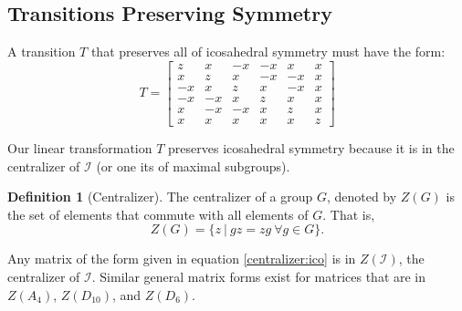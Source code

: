 \documentclass[a4paper,10pt]{article}
\theoremstyle{plain}
\theoremstyle{definition}
\newtheorem{Definition}[Theorem]{Definition}
\theoremstyle{remark}
\begin{document}
\subsection{Transitions Preserving Symmetry}
A transition \(T\) that preserves all of icosahedral symmetry must have the form: \begin{equation} \label{centralizer:ico}
T = \begin{bmatrix}
    z  & x  & -x & -x & x  & x \\
    x  & z  & x  & -x & -x & x \\
    -x & x  & z  & x  & -x & x \\
    -x & -x & x  & z  & x  & x \\
    x  & -x & -x & x  & z  & x \\
    x  & x  & x  & x  & x  & z
\end{bmatrix}\end{equation}

Our linear transformation \(T\) preserves icosahedral symmetry because it is in the centralizer of \(\mathcal{I}\) (or one its of maximal subgroups).
\begin{Definition}[Centralizer]
    The centralizer of a group \(G\), denoted by \(Z(G)\) is the set of elements that commute with all elements of \(G\).
    That is, \[Z(G) = \{z\ |\ gz = zg\ \forall g \in G\}.\]
\end{Definition}
Any matrix of the form given in equation \ref{centralizer:ico} is in \(Z(\mathcal{I})\), the centralizer of \(\mathcal{I}\).
Similar general matrix forms exist for matrices that are in \(Z(A_4)\), \(Z(D_{10})\), and \(Z(D_6)\). \cite{indelicatoetal2012}
\end{document}
